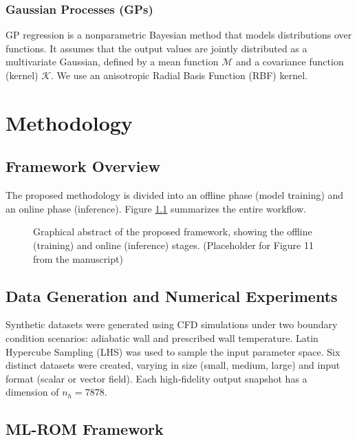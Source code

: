 \documentclass[dscexam, EN]{ufabcFHZh}
\begin{document}
\subsection{Gaussian Processes (GPs)}
GP regression is a nonparametric Bayesian method that models distributions over functions. It assumes that the output values are jointly distributed as a multivariate Gaussian, defined by a mean function $\mathcal{M}$ and a covariance function (kernel) $\mathcal{K}$. We use an anisotropic Radial Basis Function (RBF) kernel.


\chapter{Methodology}

\section{Framework Overview}
The proposed methodology is divided into an offline phase (model training) and an online phase (inference). Figure \ref{fig:grafico_abstrato_tese_en} summarizes the entire workflow.

\begin{figure}[h!]
    \centering
    \caption{Graphical abstract of the proposed framework, showing the offline (training) and online (inference) stages. (Placeholder for Figure 11 from the manuscript)}
    \label{fig:grafico_abstrato_tese_en}
\end{figure}

\section{Data Generation and Numerical Experiments}
Synthetic datasets were generated using CFD simulations under two boundary condition scenarios: adiabatic wall and prescribed wall temperature. Latin Hypercube Sampling (LHS) was used to sample the input parameter space. Six distinct datasets were created, varying in size (small, medium, large) and input format (scalar or vector field). Each high-fidelity output snapshot has a dimension of $n_h = 7878$.

\section{ML-ROM Framework}
\end{document}
